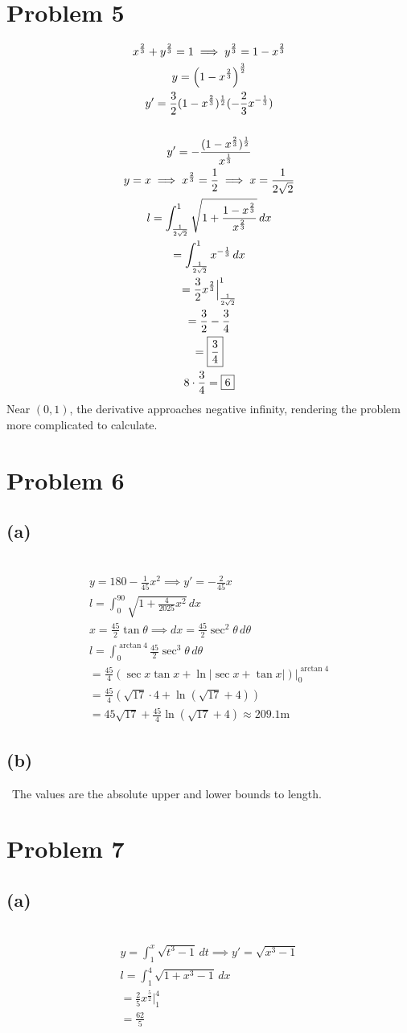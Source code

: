 \documentclass[12pt]{article}
\newcommand*{\paren}[1]{\ensuremath\left(#1\right)}
\newcommand{\at}{\Big|}
\newcommand{\problem}[1]{\section{Problem #1}}
\newcommand{\subproblem}[1]{\subsection{(#1)} \,}
\begin{document}
\problem{5}
\begin{gather*}
    x^\frac{2}{3}+y^\frac{2}{3}=1 \implies y^\frac{2}{3}=1-x^\frac{2}{3}\\
    y=\paren{1-x^\frac{2}{3}}^\frac{3}{2}\\
    y'= \frac{3}{2} (1-x^\frac{2}{3})^\frac{1}{2}(-\frac{2}{3}x^{-\frac{1}{3}})\\\\
    y'= - \frac{(1-x^\frac{2}{3})^\frac{1}{2}}{x^\frac{1}{3}}\\
    y=x \implies x^\frac{2}{3}=\frac{1}{2} \implies x =\frac{1}{2\sqrt{2}}\\
    l= \int_\frac{1}{2\sqrt{2}}^1 \sqrt{1+ \frac{1-x^\frac{2}{3}}{x^\frac{2}{3}}} \, dx\\
    = \int_\frac{1}{2\sqrt{2}}^1 x^{-\frac{1}{3}}\, dx\\
    = \frac{3}{2}x^\frac{2}{3} \at^1_{\frac{1}{2\sqrt{2}}}\\
    = \frac{3}{2}- \frac{3}{4}\\
    = \boxed{\frac{3}{4}}\\
    8\cdot \frac{3}{4} = \boxed{6}
\end{gather*}
Near $(0,1)$, the derivative approaches negative infinity, rendering the problem more complicated to calculate.

\problem{6}

\subproblem{a}
\begin{gather*}
    y=180-\frac{1}{45}x^2 \implies y'= - \frac{2}{45}x\\
    l= \int_0^{90} \sqrt{1+\frac{4}{2025}x^2}\, dx\\
    x=\frac{45}{2} \tan \theta \implies dx= \frac{45}{2}\sec^2\theta \, d \theta\\
    l=\int_0^{\arctan 4} \frac{45}{2}\sec^3 \theta \, d\theta\\
    = \frac{45}{4} (\sec x \tan x + \ln |\sec x +\tan x |) \at_0^{\arctan 4}\\
    = \frac{45}{4}(\sqrt{17} \cdot 4 + \ln (\sqrt{17} +4) )\\
    = \boxed{45\sqrt{17} + \frac{45}{4} \ln (\sqrt{17} + 4) \approx 209.1\text{m}}
\end{gather*}

\subproblem{b}
The values are the absolute upper and lower bounds to length.

\problem{7}

\subproblem{a}
\begin{gather*}
    y= \int_1^x \sqrt{t^3-1} \, dt \implies y'=\sqrt{x^3-1}\\
    l= \int_1^4\sqrt{1+x^3-1} \, dx\\
    = \frac{2}{5}x^\frac{5}{2} \at_1^4\\
    =\boxed{\frac{62}{5}}
\end{gather*}
\end{document}
